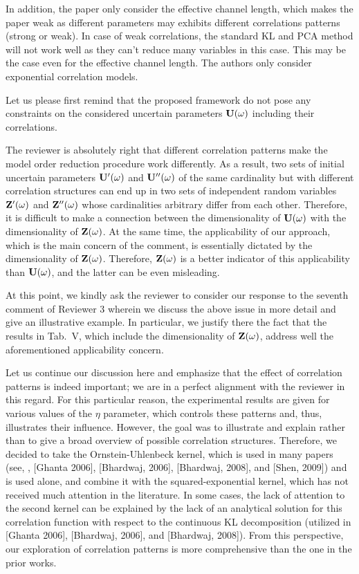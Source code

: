 \begin{reviewer}
In addition, the paper only consider the effective channel length, which makes the paper weak as different parameters may exhibits different correlations patterns (strong or weak). In case of weak correlations, the standard KL and PCA method will not work well as they can’t reduce many variables in this case. This may be the case even for the effective channel length. The authors only consider exponential correlation models.
\end{reviewer}
\begin{authors}
Let us please first remind that the proposed framework do not pose any constraints on the considered uncertain parameters $\mathbf{U}(\omega)$ including their correlations.

The reviewer is absolutely right that different correlation patterns make the model order reduction procedure work differently.
As a result, two sets of initial uncertain parameters $\mathbf{U}'(\omega)$ and $\mathbf{U}''(\omega)$ of the same cardinality but with different correlation structures can end up in two sets of independent random variables $\mathbf{Z}'(\omega)$ and $\mathbf{Z}''(\omega)$ whose cardinalities arbitrary differ from each other.
Therefore, it is difficult to make a connection between the dimensionality of $\mathbf{U}(\omega)$ with the dimensionality of $\mathbf{Z}(\omega)$.
At the same time, the applicability of our approach, which is the main concern of the comment, is essentially dictated by the dimensionality of $\mathbf{Z}(\omega)$.
Therefore, $\mathbf{Z}(\omega)$ is a better indicator of this applicability than $\mathbf{U}(\omega)$, and the latter can be even misleading.

At this point, we kindly ask the reviewer to consider our response to the seventh comment of Reviewer 3 wherein we discuss the above issue in more detail and give an illustrative example.
In particular, we justify there the fact that the results in Tab.~V, which include the dimensionality of $\mathbf{Z}(\omega)$, address well the aforementioned applicability concern.

Let us continue our discussion here and emphasize that the effect of correlation patterns is indeed important; we are in a perfect alignment with the reviewer in this regard.
For this particular reason, the experimental results are given for various values of the $\eta$ parameter, which controls these patterns and, thus, illustrates their influence.
However, the goal was to illustrate and explain rather than to give a broad overview of possible correlation structures.
Therefore, we decided to take the Ornstein-Uhlenbeck kernel, which is used in many papers (see, \eg, [Ghanta 2006], [Bhardwaj, 2006], [Bhardwaj, 2008], and [Shen, 2009]) and is used alone, and combine it with the squared-exponential kernel, which has not received much attention in the literature.
In some cases, the lack of attention to the second kernel can be explained by the lack of an analytical solution for this correlation function with respect to the continuous KL decomposition (utilized in [Ghanta 2006], [Bhardwaj, 2006], and [Bhardwaj, 2008]).
From this perspective, our exploration of correlation patterns is more comprehensive than the one in the prior works.


\end{authors}
